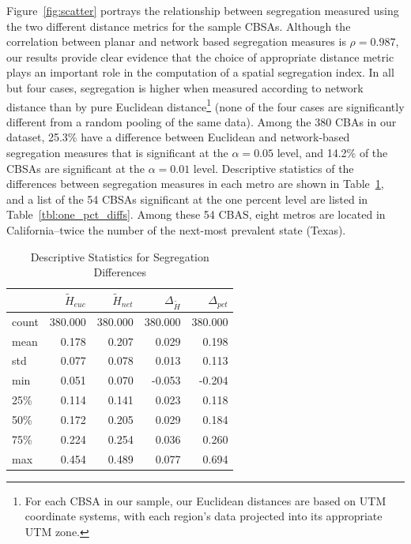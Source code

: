 \documentclass[
  10pt,
]{article}
\begin{document}
Figure~\ref{fig:scatter} portrays the relationship between segregation
measured using the two different distance metrics for the sample CBSAs.
Although the correlation between planar and network based segregation
measures is \(\rho=0.987\), our results provide clear evidence that the
choice of appropriate distance metric plays an important role in the
computation of a spatial segregation index. In all but four cases,
segregation is higher when measured according to network distance than
by pure Euclidean distance\footnote{For each CBSA in our sample, our
  Euclidean distances are based on UTM coordinate systems, with each
  region's data projected into its appropriate UTM zone.} (none of the
four cases are significantly different from a random pooling of the same
data). Among the 380 CBAs in our dataset, 25.3\% have a difference
between Euclidean and network-based segregation measures that is
significant at the \(\alpha=0.05\) level, and 14.2\% of the CBSAs are
significant at the \(\alpha=0.01\) level. Descriptive statistics of the
differences between segregation measures in each metro are shown in
Table~\ref{tbl:diff_descriptives}, and a list of the 54 CBSAs
significant at the one percent level are listed in
Table~\ref{tbl:one_pct_diffs}. Among these 54 CBAS, eight metros are
located in California--twice the number of the next-most prevalent state
(Texas).

\begin{table}
\centering
\caption{Descriptive Statistics for Segregation Differences}
\label{tbl:diff_descriptives}
\begin{tabular}{lrrrr}
\toprule
{} &  $\tilde{H}_{euc}$ &  $\tilde{H}_{net}$ &  $\Delta_{\tilde{H}}$ &  $\Delta_{pct}$ \\
\midrule
count &            380.000 &            380.000 &               380.000 &         380.000 \\
mean  &              0.178 &              0.207 &                 0.029 &           0.198 \\
std   &              0.077 &              0.078 &                 0.013 &           0.113 \\
min   &              0.051 &              0.070 &                -0.053 &          -0.204 \\
25\%  &              0.114 &              0.141 &                 0.023 &           0.118 \\
50\%  &              0.172 &              0.205 &                 0.029 &           0.184 \\
75\%  &              0.224 &              0.254 &                 0.036 &           0.260 \\
max   &              0.454 &              0.489 &                 0.077 &           0.694 \\
\bottomrule
\end{tabular}
\end{table}
\end{document}
